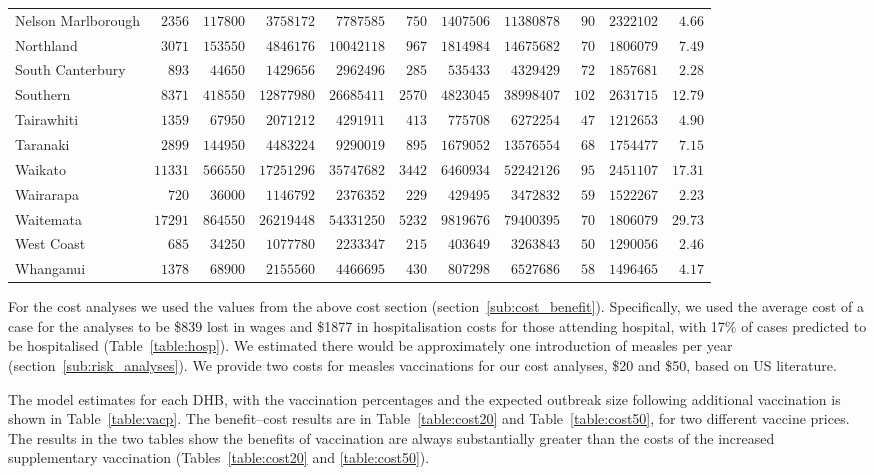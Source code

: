 \documentclass{article}
\begin{document}
\begin{table}
\begin{center}
\begin{tabular}{lrrrrrrrrrr}
Nelson Marlborough&$ 2356$&$117800$&$ 3758172$&$ 7787585$&$ 750$&$ 1407506$&$11380878$&$ 90$&$2322102$&$ 4.66$\tabularnewline
Northland&$ 3071$&$153550$&$ 4846176$&$10042118$&$ 967$&$ 1814984$&$14675682$&$ 70$&$1806079$&$ 7.49$\tabularnewline
South Canterbury&$  893$&$ 44650$&$ 1429656$&$ 2962496$&$ 285$&$  535433$&$ 4329429$&$ 72$&$1857681$&$ 2.28$\tabularnewline
Southern&$ 8371$&$418550$&$12877980$&$26685411$&$2570$&$ 4823045$&$38998407$&$102$&$2631715$&$12.79$\tabularnewline
Tairawhiti&$ 1359$&$ 67950$&$ 2071212$&$ 4291911$&$ 413$&$  775708$&$ 6272254$&$ 47$&$1212653$&$ 4.90$\tabularnewline
Taranaki&$ 2899$&$144950$&$ 4483224$&$ 9290019$&$ 895$&$ 1679052$&$13576554$&$ 68$&$1754477$&$ 7.15$\tabularnewline
Waikato&$11331$&$566550$&$17251296$&$35747682$&$3442$&$ 6460934$&$52242126$&$ 95$&$2451107$&$17.31$\tabularnewline
Wairarapa&$  720$&$ 36000$&$ 1146792$&$ 2376352$&$ 229$&$  429495$&$ 3472832$&$ 59$&$1522267$&$ 2.23$\tabularnewline
Waitemata&$17291$&$864550$&$26219448$&$54331250$&$5232$&$ 9819676$&$79400395$&$ 70$&$1806079$&$29.73$\tabularnewline
West Coast&$  685$&$ 34250$&$ 1077780$&$ 2233347$&$ 215$&$  403649$&$ 3263843$&$ 50$&$1290056$&$ 2.46$\tabularnewline
Whanganui&$ 1378$&$ 68900$&$ 2155560$&$ 4466695$&$ 430$&$  807298$&$ 6527686$&$ 58$&$1496465$&$ 4.17$\tabularnewline
\hline
\end{tabular}\end{center}\label{table:cost50}
\end{table}


For the cost analyses we used the values from the above cost section (section~\autoref{sub:cost_benefit}). Specifically, we used the average cost of a case for the analyses to be \$839 lost in wages and \$1877 in hospitalisation costs for those attending hospital, with 17\% of cases predicted to be hospitalised (Table~\autoref{table:hosp}). We estimated there would be approximately one introduction of measles per year (section~\autoref{sub:risk_analyses}). We provide two costs for measles vaccinations for our cost analyses, \$20 and \$50, based on US literature.

The model estimates for each DHB, with the vaccination percentages and the expected outbreak size following additional vaccination is shown in Table~\autoref{table:vacp}. The benefit--cost results are in Table~\autoref{table:cost20} and Table~\autoref{table:cost50}, for two different vaccine prices. The results in the two tables show the benefits of vaccination are always substantially greater than the costs of the increased supplementary vaccination (Tables~\autoref{table:cost20} and \autoref{table:cost50}).
\end{document}
